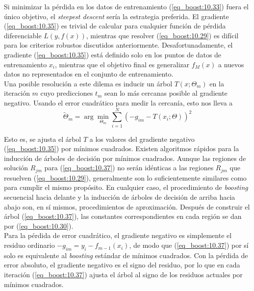 Si minimizar la pérdida en los datos de entrenamiento (\ref{eq_boost:10.33}) fuera el único objetivo, el \textit{steepest descent} sería la estrategia preferida. El gradiente (\ref{eq_boost:10.35}) es trivial de calcular para cualquier función de pérdida diferenciable $L(y,f(x))$, mientras que resolver (\ref{eq_boost:10.29}) es difícil para los criterios robustos discutidos anteriormente. Desafortunadamente, el gradiente (\ref{eq_boost:10.35}) está definido solo en los puntos de datos de entrenamiento $x_i$, mientras que el objetivo final es generalizar $f_M(x)$ a nuevos datos no representados en el conjunto de entrenamiento. \\

Una posible resolución a este dilema es inducir un árbol $T(x; \Theta_m)$ en la iteración $m$ cuyo predicciones $t_m$ sean lo más cercanas posible al gradiente negativo. Usando el error cuadrático para medir la cercanía, esto nos lleva a
\begin{equation}
\tilde{\Theta}_m = \arg\min_{\Theta_m} \sum_{i=1}^{N} \left( -g_{im} - T(x_i; \Theta) \right)^2
\label{eq_boost:10.37}
\end{equation}

Esto es, se ajusta el árbol $T$ a los valores del gradiente negativo (\ref{eq_boost:10.35}) por mínimos cuadrados. Existen algoritmos rápidos para la inducción de árboles de decisión por mínimos cuadrados. Aunque las regiones de solución $R_{jm}$ para (\ref{eq_boost:10.37}) no serán idénticas a las regiones $R_{jm}$ que resuelven (\ref{eq_boost:10.29}), generalmente son lo suficientemente similares como para cumplir el mismo propósito. En cualquier caso, el procedimiento de \textit{boosting} secuencial hacia delante y la inducción de árboles de decisión de arriba hacia abajo son, en sí mismos, procedimientos de aproximación. Después de construir el árbol (\ref{eq_boost:10.37}), las constantes correspondientes en cada región se dan por (\ref{eq_boost:10.30}). \\

Para la pérdida de error cuadrático, el gradiente negativo es simplemente el residuo ordinario $-g_{im} = y_i - f_{m-1}(x_i)$, de modo que (\ref{eq_boost:10.37}) por sí solo es equivalente al \textit{boosting} estándar de mínimos cuadrados. Con la pérdida de error absoluto, el gradiente negativo es el signo del residuo, por lo que en cada iteración (\ref{eq_boost:10.37}) ajusta el árbol al signo de los residuos actuales por mínimos cuadrados. \\

